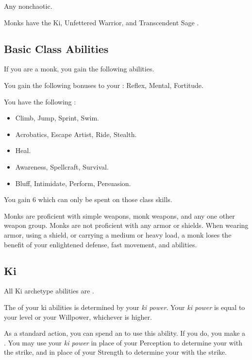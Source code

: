      Any nonchaotic.

     Monks have the Ki, Unfettered Warrior, and Transcendent Sage .

    \subsection{Basic Class Abilities}
        If you are a monk, you gain the following abilities.

        You gain the following bonuses to your :  Reflex,  Mental,  Fortitude.

        You have the following :
        \begin{itemize}
            \item {} Climb, Jump, Sprint, Swim.
            \item {} Acrobatics, Escape Artist, Ride, Stealth.
            \item {} Heal.
            \item {} Awareness, Spellcraft, Survival.
            \item {} Bluff, Intimidate, Perform, Persuasion.
        \end{itemize}
        You gain 6  which can only be spent on those class skills.

        Monks are proficient with simple weapons, monk weapons, and any one other weapon group.
        Monks are not proficient with any armor or shields.
        When wearing armor, using a shield, or carrying a medium or heavy load, a monk loses the benefit of your enlightened defense, fast movement, and \ki abilities.

    \subsection{Ki}
        All Ki archetype abilities are .

        The  of your ki abilities is determined by your \textit{ki power}.
        Your \textit{ki power} is equal to your level or your Willpower, whichever is higher.

        As a standard action, you can spend an  to use this ability.
        If you do, you make a .
        You may use your \textit{ki power} in place of your Perception to determine your  with the strike, and in place of your Strength to determine your  with the strike.


